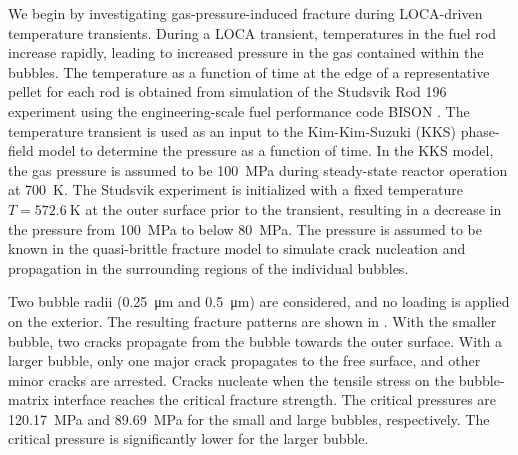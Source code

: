 We begin by investigating gas-pressure-induced fracture during LOCA-driven temperature transients. During a LOCA transient, temperatures in the fuel rod increase rapidly, leading to increased pressure in the gas contained within the bubbles. The temperature as a function of time at the edge of a representative pellet for each rod is obtained from simulation of the Studsvik Rod 196 experiment \cite{STUDSVIK} using the engineering-scale fuel performance code BISON \cite{WILLIAMSON2020}. The temperature transient is used as an input to the Kim-Kim-Suzuki (KKS) phase-field model \cite{Aagesen2020} to determine the pressure as a function of time. In the KKS model, the gas pressure is assumed to be \SI{100}{\mega\pascal} during steady-state reactor operation at \SI{700}{\kelvin}. The Studsvik experiment is initialized with a fixed temperature $T = \SI{572.6}{\kelvin}$ at the outer surface prior to the transient, resulting in a decrease in the pressure from \SI{100}{\mega\pascal} to below \SI{80}{\mega\pascal}. The pressure is assumed to be known in the quasi-brittle fracture model to simulate crack nucleation and propagation in the surrounding regions of the individual bubbles.

Two bubble radii (\SI{0.25}{\micro\meter} and \SI{0.5}{\micro\meter}) are considered, and no loading is applied on the exterior. The resulting fracture patterns are shown in . With the smaller bubble, two cracks propagate from the bubble towards the outer surface. With a larger bubble, only one major crack propagates to the free surface, and other minor cracks are arrested. Cracks nucleate when the tensile stress on the bubble-matrix interface reaches the critical fracture strength. The critical pressures are \SI{120.17}{\mega\pascal} and \SI{89.69}{\mega\pascal} for the small and large bubbles, respectively. The critical pressure is significantly lower for the larger bubble.

